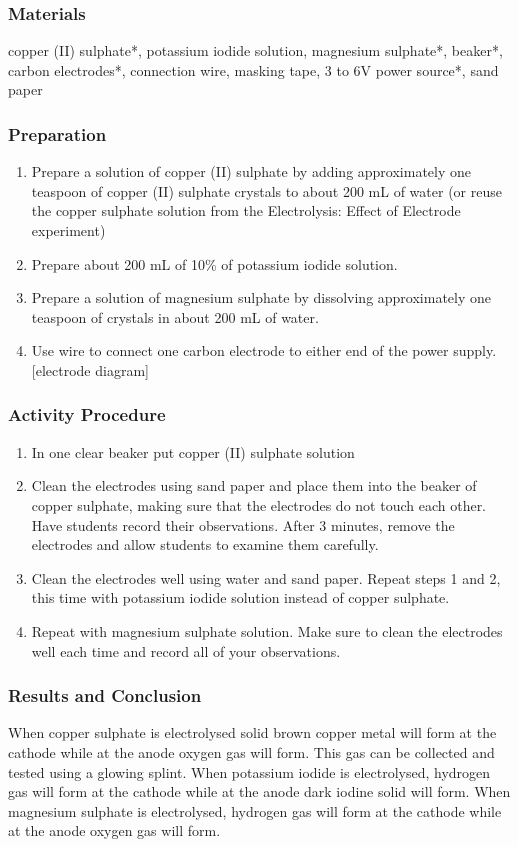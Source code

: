 \subsubsection*{Materials}
 copper (II) sulphate*, potassium iodide solution, magnesium sulphate*, beaker*, carbon electrodes*, connection wire, masking tape, 3 to 6V power source*, sand paper

\subsubsection*{Preparation}
\begin{enumerate}
\item{Prepare a solution of copper (II) sulphate by adding approximately one teaspoon of copper (II) sulphate crystals to about 200 mL of water (or reuse the copper sulphate solution from the Electrolysis: Effect of Electrode experiment)}
\item{Prepare about 200 mL of 10\% of potassium iodide solution.}
\item{Prepare a solution of magnesium sulphate by dissolving approximately one teaspoon of crystals in about 200 mL of water.}
\item{Use wire to connect one carbon electrode to either end of the power supply. [electrode diagram]}
\end{enumerate}

\subsubsection*{Activity Procedure}
\begin{enumerate}
\item{In one clear beaker put copper (II) sulphate solution}
\item{Clean the electrodes using sand paper and place them into the beaker of copper sulphate, making sure that the electrodes do not touch each other.  Have students record their observations. After 3 minutes, remove the electrodes and allow students to examine them carefully.}
\item{Clean the electrodes well using water and sand paper. Repeat steps 1 and 2, this time with potassium iodide solution instead of copper sulphate.}
\item{Repeat with magnesium sulphate solution. Make sure to clean the electrodes well each time and record all of your observations.}
\end{enumerate}

\subsubsection*{Results and Conclusion}
When copper sulphate is electrolysed solid brown copper metal will form at the cathode while at the anode oxygen gas will form. This gas can be collected and tested using a glowing splint.
When potassium iodide is electrolysed, hydrogen gas will form at the cathode while at the anode dark iodine solid will form.
When magnesium sulphate is electrolysed, hydrogen gas will form at the cathode while at the anode oxygen gas will form.

